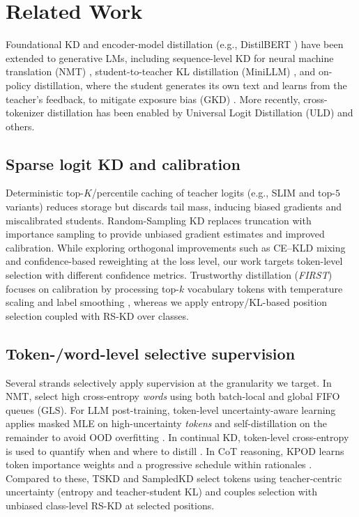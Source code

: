 \documentclass[11pt]{article}
\begin{document}
\section{Related Work}

Foundational KD \citep{hinton2015distillation} and encoder-model distillation (e.g., DistilBERT \citep{sanh2019distilbert}) have been extended to generative LMs, including sequence-level KD for neural machine translation (NMT) \citep{kim2016sequencekd}, student-to-teacher KL distillation (MiniLLM) \citep{gu2023minillm}, and on-policy distillation, where the student generates its own text and learns from the teacher's feedback, to mitigate exposure bias (GKD) \citep{agarwal2024gkd}.
More recently, cross-tokenizer distillation has been enabled by Universal Logit Distillation (ULD) \citep{boizard2024uld} and others.

\subsection{Sparse logit KD and calibration}
Deterministic top-$K$/percentile caching of teacher logits (e.g., SLIM \citep{raman2023slim} and top-$5$ variants) reduces storage but discards tail mass, inducing biased gradients and miscalibrated students.
Random-Sampling KD \citep{anshumann2025sparse} replaces truncation with importance sampling to provide unbiased gradient estimates and improved calibration.
While exploring orthogonal improvements such as CE--KLD mixing and confidence-based reweighting at the loss level, our work targets token-level selection with different confidence metrics.
Trustworthy distillation (\emph{FIRST}) focuses on calibration by processing top-$k$ vocabulary tokens with temperature scaling and label smoothing \citep{shum2024first}, whereas we apply entropy/KL-based position selection coupled with RS-KD over classes.

\subsection{Token-/word-level selective supervision} Several strands selectively apply supervision at the granularity we target. In NMT, \citet{wang2021selectivekd} select high cross-entropy \emph{words} using both batch-local and global FIFO queues (GLS). For LLM post-training, token-level uncertainty-aware learning applies masked MLE on high-uncertainty \emph{tokens} and self-distillation on the remainder to avoid OOD overfitting \citep{liu2025tokenlevel}. In continual KD, token-level cross-entropy is used to quantify when and where to distill \citep{zhang2023continualkd}. In CoT reasoning, KPOD learns token importance weights and a progressive schedule within rationales \citep{feng2024kpod}.
Compared to these, TSKD and SampledKD select tokens using teacher-centric uncertainty (entropy and teacher-student KL) and couples selection with unbiased class-level RS-KD at selected positions.
\end{document}
